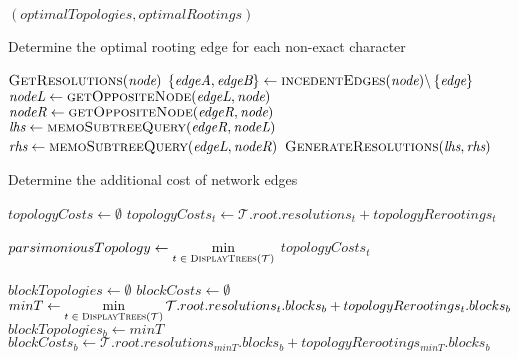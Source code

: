 \documentclass[12pt]{article}
\begin{document}
{\begin{algorithm}
\begin{algorithmic}[1]
		\EndFor		
		
		\State \Return $(optimalTopologies, optimalRootings)$

		\EndFunction
	\end{algorithmic}
\end{algorithm}


\begin{algorithm}
	\caption{Determine the optimal rooting edge for each non-exact character}
	\label{Alg:generate-resolutions}
	\begin{algorithmic}[1]
		  \State \Return $\Call{GetResolutions}{\textit{node}}$
		\EndIf
		\State $\left\{ \textit{edgeA}, \textit{edgeB} \right\} \gets \Call{incedentEdges}{\textit{node}} \backslash \left\{ \textit{edge} \right\}$
		\State $\textit{nodeL} \gets \Call{getOppositeNode}{ \textit{edgeL}, \textit{node} }$
		\State $\textit{nodeR} \gets \Call{getOppositeNode}{ \textit{edgeR}, \textit{node} }$
		\State $\textit{lhs} \gets \Call{memoSubtreeQuery}{\textit{edgeR},\textit{nodeL}}$
		\State $\textit{rhs} \gets \Call{memoSubtreeQuery}{\textit{edgeL},\textit{nodeR}}$
		\State \Return $\Call{GenerateResolutions}{\textit{lhs}, \textit{rhs}}$
		\EndFunction
	\end{algorithmic}
\end{algorithm}


\begin{algorithm}
	\caption{Determine the additional cost of network edges}
	\label{Alg:network-edge-cost}
	\begin{algorithmic}[1]
		
		\State $topologyCosts \gets \emptyset$
		  \State $topologyCosts_{t} \gets \mathcal{T}.root.resolutions_{t} + topologyRerootings_t$
		\EndFor
		
		\State $parsimoniousTopology \gets \min\limits_{t\; \in\; \Call{DisplayTrees}{\mathcal{T}}}$ $topologyCosts_{t}$
		
		\State $blockTopologies \gets \emptyset$
		\State $blockCosts      \gets \emptyset$
		  \State $minT \gets \min\limits_{t\; \in\; \Call{DisplayTrees}{\mathcal{T}}} \mathcal{T}.root.resolutions_{t}.blocks_{b} + topologyRerootings_{t}.blocks_{b}$
          \State $blockTopologies_{b} \gets minT$
          \State $blockCosts_{b}      \gets \mathcal{T}.root.resolutions_{minT}.blocks_{b} + topologyRerootings_{minT}.blocks_{b}$
		\EndFor
		

\end{algorithmic}
\end{algorithm}}
\end{document}
